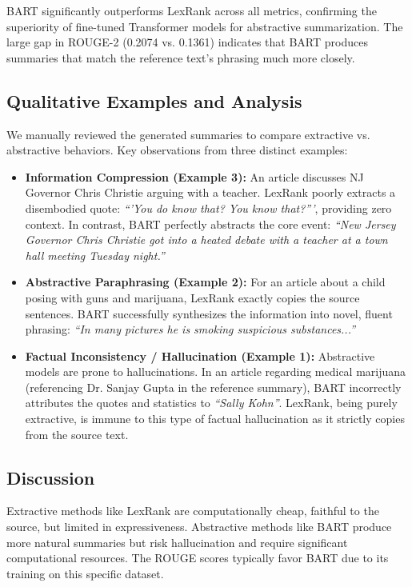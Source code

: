 \documentclass[12pt, a4paper]{article}
\begin{document}
BART significantly outperforms LexRank across all metrics, confirming the superiority of fine-tuned Transformer models for abstractive summarization. The large gap in ROUGE-2 (0.2074 vs. 0.1361) indicates that BART produces summaries that match the reference text's phrasing much more closely.

\subsection{Qualitative Examples and Analysis}

We manually reviewed the generated summaries to compare extractive vs. abstractive behaviors. Key observations from three distinct examples:
\begin{itemize}
    \item \textbf{Information Compression (Example 3):} An article discusses NJ Governor Chris Christie arguing with a teacher. LexRank poorly extracts a disembodied quote: \textit{``'You do know that? You know that?'''}, providing zero context. In contrast, BART perfectly abstracts the core event: \textit{``New Jersey Governor Chris Christie got into a heated debate with a teacher at a town hall meeting Tuesday night.''}
    \item \textbf{Abstractive Paraphrasing (Example 2):} For an article about a child posing with guns and marijuana, LexRank exactly copies the source sentences. BART successfully synthesizes the information into novel, fluent phrasing: \textit{``In many pictures he is smoking suspicious substances...''}
    \item \textbf{Factual Inconsistency / Hallucination (Example 1):} Abstractive models are prone to hallucinations. In an article regarding medical marijuana (referencing Dr. Sanjay Gupta in the reference summary), BART incorrectly attributes the quotes and statistics to \textit{``Sally Kohn''}. LexRank, being purely extractive, is immune to this type of factual hallucination as it strictly copies from the source text.
\end{itemize}

\subsection{Discussion}

Extractive methods like LexRank are computationally cheap, faithful to the source, but limited in expressiveness. Abstractive methods like BART produce more natural summaries but risk hallucination and require significant computational resources. The ROUGE scores typically favor BART due to its training on this specific dataset.
\end{document}
